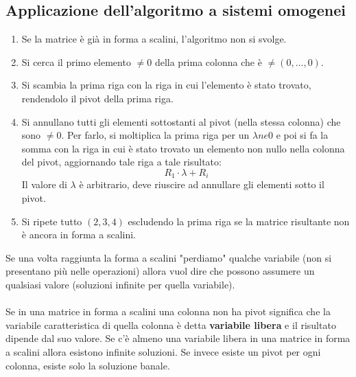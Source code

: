 \documentclass[12pt,a4paper]{article}
\begin{document}
\subsection{Applicazione dell'algoritmo a sistemi omogenei}
\begin{enumerate}
  \item Se la matrice è già in forma a scalini, l'algoritmo non si svolge.
  \item Si cerca il primo elemento $\ne 0$ della prima colonna che è $\ne (0,\ldots,0)$.
  \item Si scambia la prima riga con la riga in cui l'elemento è stato trovato, rendendolo il pivot della prima riga.
  \item Si annullano tutti gli elementi sottostanti al pivot (nella stessa colonna) che sono $\ne 0$. Per farlo, si moltiplica la prima riga per un $\lambda ne 0$ e poi si fa la somma con la riga in cui è stato trovato un elemento non nullo nella colonna del pivot, aggiornando tale riga a tale risultato:
  \[
  R_1 \cdot \lambda + R_i
  \]
  Il valore di $\lambda$ è arbitrario, deve riuscire ad annullare gli elementi sotto il pivot.
  \item Si ripete tutto $(2,3,4)$ escludendo la prima riga se la matrice risultante non è ancora in forma a scalini.
\end{enumerate}
Se una volta raggiunta la forma a scalini "perdiamo" qualche variabile (non si presentano
più nelle operazioni) allora vuol dire che possono assumere un qualsiasi valore (soluzioni infinite per quella variabile).\\\\
Se in una matrice in forma a scalini una colonna non ha pivot significa che la variabile caratteristica di quella colonna è detta \textbf{variabile libera} e il risultato dipende dal suo valore. Se c'è almeno una variabile libera in una matrice
in forma a scalini allora esistono infinite soluzioni.
Se invece esiste un pivot per ogni colonna, esiste solo la soluzione banale.
\end{document}
